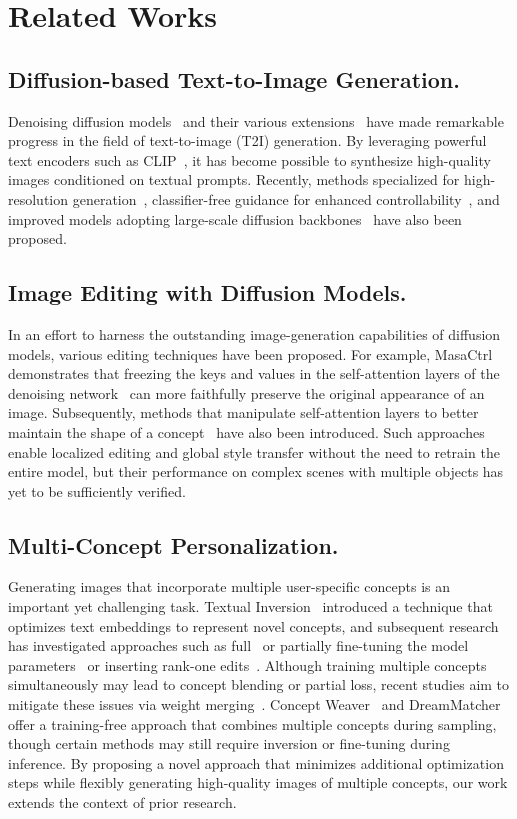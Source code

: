 \section{Related Works}
\subsection{Diffusion-based Text-to-Image Generation.}
Denoising diffusion models~\cite{ho2020denoising,song2020denoising} and their various extensions~\cite{rombach2022high,podell2023sdxl} have made remarkable progress in the field of text-to-image (T2I) generation. 
By leveraging powerful text encoders such as CLIP~\cite{radford2021learning}, it has become possible to synthesize high-quality images conditioned on textual prompts. 
Recently, methods specialized for high-resolution generation~\cite{rombach2022high}, classifier-free guidance for enhanced controllability~\cite{ho2022classifier}, and improved models adopting large-scale diffusion backbones~\cite{podell2023sdxl} have also been proposed.

\subsection{Image Editing with Diffusion Models.}
In an effort to harness the outstanding image-generation capabilities of diffusion models, various editing techniques have been proposed. 
For example, MasaCtrl~\cite{cao2023masactrl} demonstrates that freezing the keys and values in the self-attention layers of the denoising network~\cite{ronneberger2015u} can more faithfully preserve the original appearance of an image. 
Subsequently, methods that manipulate self-attention layers to better maintain the shape of a concept~\cite{cao2023masactrl,nam2024dreammatcher,alaluf2024cross} have also been introduced. 
Such approaches enable localized editing and global style transfer without the need to retrain the entire model, but their performance on complex scenes with multiple objects has yet to be sufficiently verified.

\subsection{Multi-Concept Personalization.}
Generating images that incorporate multiple user-specific concepts is an important yet challenging task. 
Textual Inversion~\cite{gal2022image} introduced a technique that optimizes text embeddings to represent novel concepts, and subsequent research has investigated approaches such as full~\cite{ruiz2023dreambooth} or partially fine-tuning the model parameters~\cite{kumari2023multi} or inserting rank-one edits~\cite{tewel2023key}. 
Although training multiple concepts simultaneously may lead to concept blending or partial loss, recent studies aim to mitigate these issues via weight merging~\cite{gu2024mix}. Concept Weaver~\cite{kwon2024concept} and DreamMatcher~\cite{nam2024dreammatcher} offer a training-free approach that combines multiple concepts during sampling, though certain methods may still require inversion or fine-tuning during inference. 
By proposing a novel approach that minimizes additional optimization steps while flexibly generating high-quality images of multiple concepts, our work extends the context of prior research.